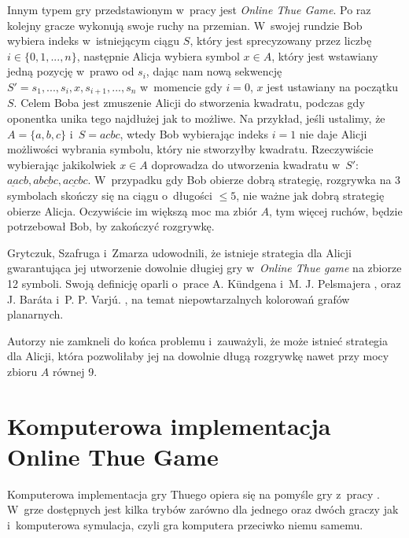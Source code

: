 \documentclass[document]{xmgr}
\begin{document}
Innym typem gry przedstawionym w~pracy \cite{thueonline} jest \emph{Online Thue Game}. Po raz kolejny gracze wykonują swoje ruchy na przemian. W~swojej rundzie Bob wybiera indeks w~istniejącym ciągu $S$, który jest sprecyzowany przez liczbę $i \in \{0, 1, ..., n\}$, następnie Alicja wybiera symbol $x \in A$, który jest wstawiany jedną pozycję w~prawo od $s_i$, dając nam nową sekwencję $S' = s_1, ..., s_i, x, s_{i+1}, ...,s_n$ w~momencie gdy $i = 0$, $x$ jest ustawiany na początku $S$. Celem Boba jest zmuszenie Alicji do stworzenia kwadratu, podczas gdy oponentka unika tego najdłużej jak to możliwe. Na przykład, jeśli ustalimy, że $A = \{a, b, c\}$ i~$S = acbc$, wtedy Bob wybierając indeks $i = 1$ nie daje Alicji możliwości wybrania symbolu, który nie stworzyłby kwadratu. Rzeczywiście wybierając jakikolwiek $x \in A$ doprowadza do utworzenia kwadratu w~$S'$: $\underline{aa}cb, a\underline{bcbc}, a\underline{cc}bc$. W~przypadku gdy Bob obierze dobrą strategię, rozgrywka na 3 symbolach skończy się na ciągu o~długości $\leq 5$, nie ważne jak dobrą strategię obierze Alicja. Oczywiście im większą moc ma zbiór $A$, tym więcej ruchów, będzie potrzebował Bob, by zakończyć rozgrywkę. 

Grytczuk, Szafruga i~Zmarza \cite{thueonline} udowodnili, że istnieje strategia dla Alicji gwarantująca jej utworzenie dowolnie długiej gry w~\emph{Online Thue game} na zbiorze 12 symboli. Swoją definicję oparli o~prace A. Kündgena i~M. J. Pelsmajera \cite{first}, oraz J. Baráta i~P. P. Varjú. \cite{second}, na temat niepowtarzalnych kolorowań grafów planarnych.

Autorzy \cite{thueonline} nie zamkneli do końca problemu i~zauważyli, że może istnieć strategia dla Alicji, która pozwoliłaby jej na dowolnie długą rozgrywkę nawet przy mocy zbioru $A$ równej 9.


\section{Komputerowa implementacja Online Thue Game}

Komputerowa implementacja gry Thuego opiera się na pomyśle gry z~pracy \cite{thueonline}. W~grze dostępnych jest kilka trybów zarówno dla jednego oraz dwóch graczy jak i~komputerowa symulacja, czyli gra komputera przeciwko niemu samemu.
\end{document}
